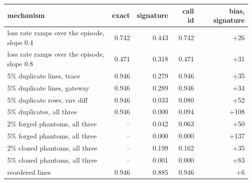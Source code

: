 \begin{tabular}{lrrrr}
\toprule
mechanism & exact & signature & call id & bias, signature \\
\midrule
loss rate ramps over the episode, slope 0.4 & 0.742 & 0.443 & 0.742 & +26 \\
loss rate ramps over the episode, slope 0.8 & 0.471 & 0.318 & 0.471 & +31 \\
5\% duplicate lines, trace & 0.946 & 0.279 & 0.946 & +35 \\
5\% duplicate lines, gateway & 0.946 & 0.289 & 0.946 & +34 \\
5\% duplicate rows, env diff & 0.946 & 0.033 & 0.080 & +52 \\
5\% duplicates, all three & 0.946 & 0.000 & 0.094 & +108 \\
2\% forged phantoms, all three & -- & 0.042 & 0.063 & +50 \\
5\% forged phantoms, all three & -- & 0.000 & 0.000 & +137 \\
2\% cloned phantoms, all three & -- & 0.199 & 0.162 & +35 \\
5\% cloned phantoms, all three & -- & 0.001 & 0.000 & +83 \\
reordered lines & 0.946 & 0.885 & 0.946 & +6 \\
\bottomrule
\end{tabular}
\par{}
